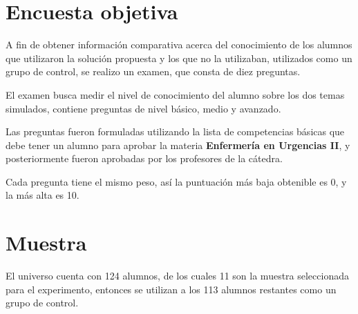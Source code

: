 \section{Encuesta objetiva}
\label{sec:objetiva}

A fin de obtener información comparativa acerca del conocimiento de los alumnos
que utilizaron la solución propuesta y los que no la utilizaban, utilizados
como un grupo de control, se realizo un examen, que consta de diez preguntas.

El examen busca medir el nivel de conocimiento del alumno sobre los dos temas
simulados, contiene preguntas de nivel básico, medio y avanzado.

Las preguntas fueron formuladas utilizando la lista de competencias básicas que
debe tener un alumno para aprobar la materia \textbf{Enfermería en Urgencias
    II}, y posteriormente fueron aprobadas por los profesores de la cátedra.

Cada pregunta tiene el mismo peso, así la puntuación más baja obtenible es 0, y
la más alta es 10.

\section{Muestra}

El universo cuenta con 124 alumnos, de los cuales 11 son la muestra seleccionada
para el experimento, entonces se utilizan a los 113 alumnos restantes como un 
grupo de control.
